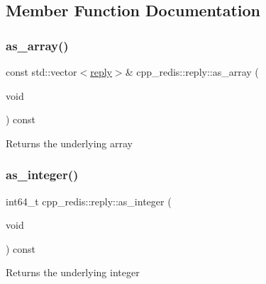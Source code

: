 \subsection{Member Function Documentation}
\mbox{\label{classcpp__redis_1_1reply_af4ead6a79c9e531912c35267d5212776}} 
\subsubsection{\texorpdfstring{as\+\_\+array()}{as\_array()}}
{\footnotesize\ttfamily const std\+::vector$<$\hyperlink{classcpp__redis_1_1reply}{reply}$>$\& cpp\+\_\+redis\+::reply\+::as\+\_\+array (\begin{DoxyParamCaption}\item[{void}]{ }\end{DoxyParamCaption}) const}

\begin{DoxyReturn}{Returns}
the underlying array 
\end{DoxyReturn}
\mbox{\label{classcpp__redis_1_1reply_a5f54d0dada956bca564ff2d7bde866ea}} 
\subsubsection{\texorpdfstring{as\+\_\+integer()}{as\_integer()}}
{\footnotesize\ttfamily int64\+\_\+t cpp\+\_\+redis\+::reply\+::as\+\_\+integer (\begin{DoxyParamCaption}\item[{void}]{ }\end{DoxyParamCaption}) const}

\begin{DoxyReturn}{Returns}
the underlying integer 
\end{DoxyReturn}
\mbox{\label{classcpp__redis_1_1reply_a5fdd9c1d3bb3b9ece6098f8b83a32597}} 
